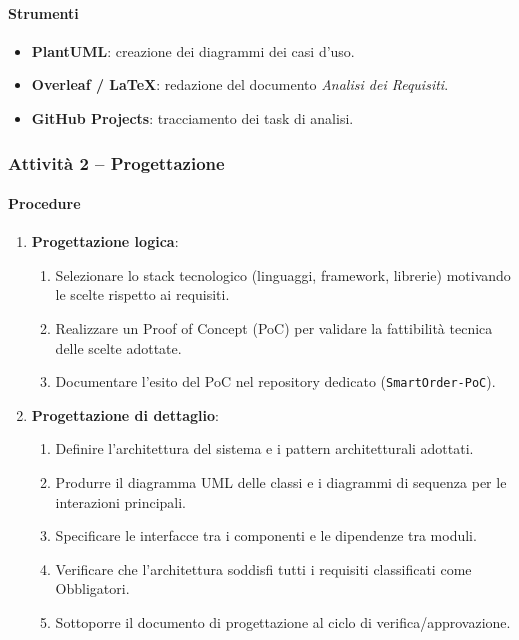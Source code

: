 \documentclass[a4paper, 11pt, oneside]{scrartcl}
\begin{document}
\paragraph{Strumenti}
\begin{itemize}
    \item \textbf{PlantUML}: creazione dei diagrammi dei casi d'uso.
    \item \textbf{Overleaf / \LaTeX{}}: redazione del documento \emph{Analisi dei Requisiti}.
    \item \textbf{GitHub Projects}: tracciamento dei task di analisi.
\end{itemize}

\subsubsection{Attività 2 – Progettazione}

\paragraph{Procedure}
\begin{enumerate}
    \item \textbf{Progettazione logica}:
          \begin{enumerate}[label=\alph*.]
              \item Selezionare lo stack tecnologico (linguaggi, framework{\scriptsize{}}, librerie) motivando le scelte rispetto ai requisiti.
              \item Realizzare un Proof of Concept{\scriptsize{}} (PoC) per validare la fattibilità tecnica delle scelte adottate.
              \item Documentare l'esito del PoC nel repository dedicato (\texttt{SmartOrder-PoC}).
          \end{enumerate}
    \item \textbf{Progettazione di dettaglio}:
          \begin{enumerate}[label=\alph*.]
              \item Definire l'architettura{\scriptsize{}} del sistema e i pattern architetturali{\scriptsize{}} adottati.
              \item Produrre il diagramma UML delle classi e i diagrammi di sequenza per le interazioni principali.
              \item Specificare le interfacce tra i componenti e le dipendenze tra moduli.
              \item Verificare che l'architettura soddisfi tutti i requisiti classificati come Obbligatori.
              \item Sottoporre il documento di progettazione al ciclo di verifica/approvazione.
          \end{enumerate}
\end{enumerate}
\end{document}
